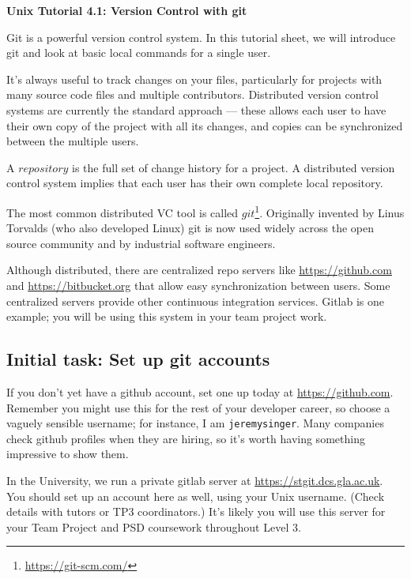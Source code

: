 \documentclass{article}
\begin{document}
\noindent
{\Large \textsf{\textbf{Unix Tutorial 4.1: Version Control with git}}}

\bigskip

Git is a powerful version control system. In this tutorial sheet, we will
introduce git and look at basic local commands for a single user.

It's always useful to track changes on your files, particularly for
projects with many source code files and multiple contributors.
Distributed version control systems are currently the standard
approach --- these allows each user to have their own copy of the
project with all its changes, and copies can be synchronized between
the multiple users.

A $repository$ is the full set of change history for a project.
A distributed version control system implies that
each user has their own complete local repository.

The most common distributed VC tool is called $git$\footnote{\url{https://git-scm.com/}}. Originally invented
by Linus Torvalds (who also developed Linux) git is now used widely
across the open source community and by industrial software engineers.

Although distributed, there are centralized repo servers like \url{https://github.com} and \url{https://bitbucket.org} that
allow easy synchronization between users. Some centralized servers
provide other continuous integration services. Gitlab is one example;
you will be using this system in your team project work.

\subsection*{Initial task: Set up git accounts}

If you don't yet have a github account, set one up today at \url{https://github.com}. Remember you might use this for the rest of your developer career, so choose a vaguely sensible username; for instance, I am \texttt{jeremysinger}. Many companies check github profiles when they are hiring, so it's worth having something impressive to show them.

In the University, we run a private gitlab server at \url{https://stgit.dcs.gla.ac.uk}. You should set up an account here as well, using your Unix username. (Check details with tutors or TP3 coordinators.) It's likely you will use this server for your Team Project and PSD coursework
throughout Level 3.
\end{document}
